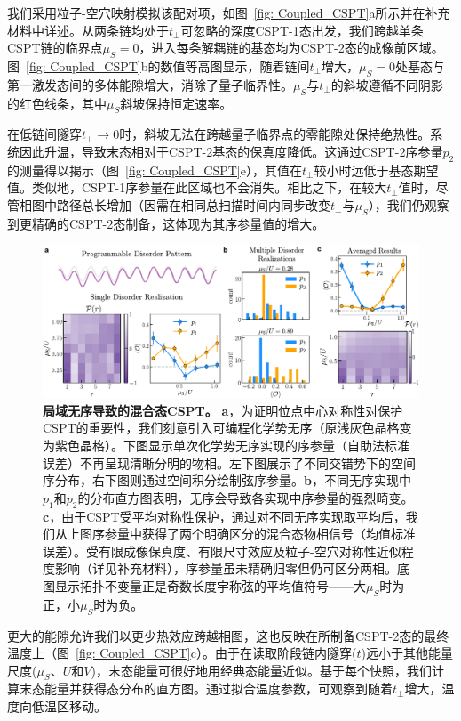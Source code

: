 \documentclass[preprint,superscriptaddress,floatfix, nofootinbib]{revtex4-2}
\begin{document}
我们采用粒子-空穴映射模拟该配对项，如图~\ref{fig: Coupled_CSPT}a所示并在补充材料中详述。从两条链均处于$t_\perp$可忽略的深度CSPT-1态出发，我们跨越单条CSPT链的临界点$\mu_S=0$，进入每条解耦链的基态均为CSPT-2态的成像前区域。图~\ref{fig: Coupled_CSPT}b的数值等高图显示，随着链间$t_\perp$增大，$\mu_S=0$处基态与第一激发态间的多体能隙增大，消除了量子临界性。$\mu_S$与$t_\perp$的斜坡遵循不同阴影的红色线条，其中$\mu_S$斜坡保持恒定速率。

在低链间隧穿$t_\perp \rightarrow 0$时，斜坡无法在跨越量子临界点的零能隙处保持绝热性。系统因此升温，导致末态相对于CSPT-2基态的保真度降低。这通过CSPT-2序参量$p_2$的测量得以揭示（图~\ref{fig: Coupled_CSPT}e），其值在$t_{\perp}$较小时远低于基态期望值。类似地，CSPT-1序参量在此区域也不会消失。相比之下，在较大$t_\perp$值时，尽管相图中路径总长增加（因需在相同总扫描时间内同步改变$t_\perp$与$\mu_S$），我们仍观察到更精确的CSPT-2态制备，这体现为其序参量值的增大。
\begin{figure}
    \centering
    \includegraphics[width=\textwidth]{figures/CSPT_average.pdf}
    \caption{\textbf{局域无序导致的混合态CSPT。} \textbf{a}，为证明位点中心对称性对保护CSPT的重要性，我们刻意引入可编程化学势无序（原浅灰色晶格变为紫色晶格）。下图显示单次化学势无序实现的序参量（自助法标准误差）不再呈现清晰分明的物相。左下图展示了不同交错势下的空间序分布，右下图则通过空间积分绘制弦序参量。\textbf{b}，不同无序实现中$p_1$和$p_2$的分布直方图表明，无序会导致各实现中序参量的强烈畸变。\textbf{c}，由于CSPT受平均对称性保护，通过对不同无序实现取平均后，我们从上图序参量中获得了两个明确区分的混合态物相信号（均值标准误差）。受有限成像保真度、有限尺寸效应及粒子-空穴对称性近似程度影响（详见补充材料），序参量虽未精确归零但仍可区分两相。底图显示拓扑不变量正是奇数长度宇称弦的平均值符号——大$\mu_S$时为正，小$\mu_S$时为负。}
    \label{fig: CSPT_average}
\end{figure}

更大的能隙允许我们以更少热效应跨越相图，这也反映在所制备CSPT-2态的最终温度上（图~\ref{fig: Coupled_CSPT}c）。由于在读取阶段链内隧穿($t$)远小于其他能量尺度($\mu_S$、$U$和$V$)，末态能量可很好地用经典态能量近似。基于每个快照，我们计算末态能量并获得态分布的直方图。通过拟合温度参数，可观察到随着$t_\perp$增大，温度向低温区移动。
\end{document}

